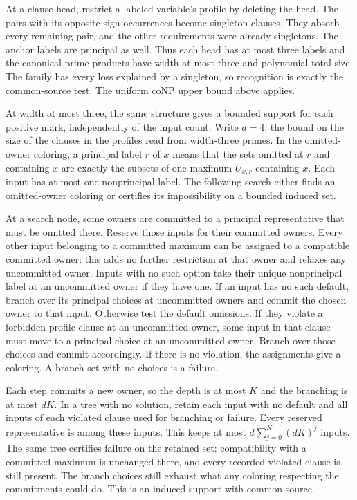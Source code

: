 At a clause head, restrict a labeled variable's
profile by deleting the head. The pairs with its
opposite-sign occurrences become singleton clauses.
They absorb every remaining pair, and the other
requirements were already singletons. The anchor
labels are principal as well. Thus each head has
at most three labels and the canonical prime products
have width at most three and polynomial total size.
The family has every loss explained by a singleton,
so recognition is exactly the common-source test.
The uniform coNP upper bound above applies.

At width at most three, the same structure gives a bounded
support for each positive mark, independently of the input
count. Write $d=4$, the bound on the size of the clauses in
the profiles read from width-three primes. In the omitted-owner
coloring, a principal label $r$ of $x$ means that the sets
omitted at $r$ and containing $x$ are exactly the subsets of
one maximum $U_{x,r}$ containing $x$. Each input has at most
one nonprincipal label. The following search either finds an
omitted-owner coloring or certifies its impossibility on a
bounded induced set.

At a search node, some owners are committed to a principal
representative that must be omitted there. Reserve those inputs
for their committed owners. Every other input belonging to a
committed maximum can be assigned to a compatible committed
owner: this adds no further restriction at that owner and
relaxes any uncommitted owner. Inputs with no such option take
their unique nonprincipal label at an uncommitted owner if
they have one. If an input has no such default, branch over
its principal choices at uncommitted owners and commit the
chosen owner to that input. Otherwise test the default
omissions. If they violate a forbidden profile clause at an
uncommitted owner, some input in that clause must move to a
principal choice at an uncommitted owner. Branch over those
choices and commit accordingly. If there is no violation,
the assignments give a coloring. A branch set with no choices
is a failure.

Each step commits a new owner, so the depth is at most $K$ and
the branching is at most $dK$. In a tree with no solution,
retain each input with no default and all inputs of each
violated clause used for branching or failure. Every reserved
representative is among these inputs. This keeps at most
$d\sum_{j=0}^K(dK)^j$ inputs. The same tree certifies failure
on the retained set: compatibility with a committed maximum
is unchanged there, and every recorded violated clause is
still present. The branch choices still exhaust what any
coloring respecting the commitments could do. This is an
induced support with common source.

